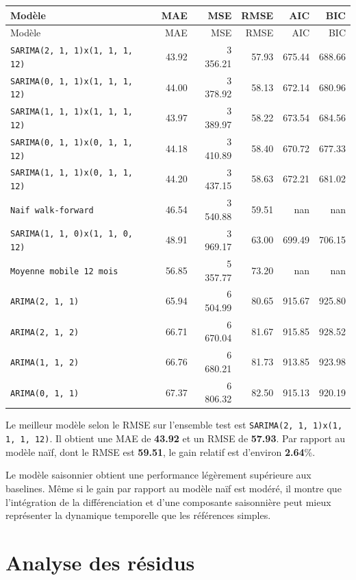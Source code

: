 \documentclass[12pt,a4paper]{report}
\begin{document}
\begin{longtable}{p{6.8cm}rrrrr}
\toprule
Modèle & MAE & MSE & RMSE & AIC & BIC \\
\midrule
\endfirsthead
\toprule
Modèle & MAE & MSE & RMSE & AIC & BIC \\
\midrule
\endhead
\texttt{SARIMA(2, 1, 1)x(1, 1, 1, 12)} & 43.92 & 3 356.21 & 57.93 & 675.44 & 688.66 \\
\texttt{SARIMA(0, 1, 1)x(1, 1, 1, 12)} & 44.00 & 3 378.92 & 58.13 & 672.14 & 680.96 \\
\texttt{SARIMA(1, 1, 1)x(1, 1, 1, 12)} & 43.97 & 3 389.97 & 58.22 & 673.54 & 684.56 \\
\texttt{SARIMA(0, 1, 1)x(0, 1, 1, 12)} & 44.18 & 3 410.89 & 58.40 & 670.72 & 677.33 \\
\texttt{SARIMA(1, 1, 1)x(0, 1, 1, 12)} & 44.20 & 3 437.15 & 58.63 & 672.21 & 681.02 \\
\texttt{Naif walk-forward} & 46.54 & 3 540.88 & 59.51 & nan & nan \\
\texttt{SARIMA(1, 1, 0)x(1, 1, 0, 12)} & 48.91 & 3 969.17 & 63.00 & 699.49 & 706.15 \\
\texttt{Moyenne mobile 12 mois} & 56.85 & 5 357.77 & 73.20 & nan & nan \\
\texttt{ARIMA(2, 1, 1)} & 65.94 & 6 504.99 & 80.65 & 915.67 & 925.80 \\
\texttt{ARIMA(2, 1, 2)} & 66.71 & 6 670.04 & 81.67 & 915.85 & 928.52 \\
\texttt{ARIMA(1, 1, 2)} & 66.76 & 6 680.21 & 81.73 & 913.85 & 923.98 \\
\texttt{ARIMA(0, 1, 1)} & 67.37 & 6 806.32 & 82.50 & 915.13 & 920.19 \\
\bottomrule
\end{longtable}

Le meilleur modèle selon le RMSE sur l'ensemble test est \texttt{SARIMA(2, 1, 1)x(1, 1, 1, 12)}. Il obtient une MAE de \textbf{43.92} et un RMSE de \textbf{57.93}. Par rapport au modèle naïf, dont le RMSE est \textbf{59.51}, le gain relatif est d'environ \textbf{2.64}\%.

Le modèle saisonnier obtient une performance légèrement supérieure aux baselines. Même si le gain par rapport au modèle naïf est modéré, il montre que l'intégration de la différenciation et d'une composante saisonnière peut mieux représenter la dynamique temporelle que les références simples.

\section{Analyse des résidus}
\end{document}
